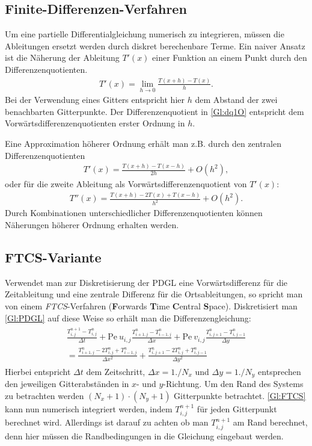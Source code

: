 \subsection{Finite-Differenzen-Verfahren}
Um eine partielle Differentialgleichung numerisch zu integrieren, müssen die Ableitungen ersetzt werden durch diskret berechenbare Terme.
Ein naiver Ansatz ist die Näherung der Ableitung $T'(x)$ einer Funktion an einem Punkt durch den Differenzenquotienten.
\begin{align}
  T'(x) = \lim_{h\rightarrow 0}\frac{T(x+h)-T(x)}{h}.\label{Gl:dq1O}
\end{align}
Bei der Verwendung eines Gitters entspricht hier $h$ dem Abstand der zwei benachbarten Gitterpunkte.
Der Differenzenquotient in \cref{Gl:dq1O} entspricht dem Vorwärtsdifferenzenquotienten erster Ordnung in $h$.

Eine Approximation höherer Ordnung erhält man z.B. durch den zentralen Differenzenquotienten
\begin{align}
  T'(x) = \frac{T(x+h)-T(x-h)}{2h} + O(h^2),\label{Gl:dq2O}
\end{align}
oder für die zweite Ableitung als Vorwärtsdifferenzenquotient von $T'(x)$:
\begin{align}
  T''(x) = \frac{T(x+h)-2T(x)+T(x-h)}{h^2}+O(h^2).\label{Gl:dq2O2Abl}
\end{align}
Durch Kombinationen unterschiedlicher Differenzenquotienten können Näherungen höherer Ordnung erhalten werden.
\subsection{FTCS-Variante}
Verwendet man zur Diskretisierung der PDGL eine Vorwärtsdifferenz für die Zeitableitung und eine zentrale Differenz für die Ortsableitungen, so spricht man von einem \emph{FTCS}-Verfahren (\textbf{F}orwards \textbf{T}ime \textbf{C}entral \textbf{S}pace).
Diskretisiert man \cref{Gl:PDGL} auf diese Weise so erhält man die Differenzengleichung:
\begin{align}
  \begin{split}
  \frac{T^{n+1}_{i,j}-T^{n}_{i,j}}{\Delta t} + \text{Pe}~ u_{i,j} \frac{T^{n}_{i+1,j}-T^{n}_{i-1,j}}{\Delta x} + \text{Pe}~ v_{i,j} \frac{T^{n}_{i,j+1}-T^{n}_{i,j-1}}{\Delta y}\\
   =  \frac{T^{n}_{i+1,j}-2T^{n}_{i,j}+T^{n}_{i-1,j}}{\Delta x^2} +\frac{T^{n}_{i,j+1}-2T^{n}_{i,j}+T^{n}_{i,j-1}}{\Delta y^2}
 \end{split}\label{Gl:FTCS}
\end{align}
Hierbei entspricht $\Delta t$ dem Zeitschritt, $\Delta x = 1./N_x$ und $\Delta y = 1./N_y$ entsprechen den jeweiligen Gitterabständen in $x$- und $y$-Richtung.
Um den Rand des Systems zu betrachten werden $(N_x+1) \cdot (N_y+1)$ Gitterpunkte betrachtet.
\cref{Gl:FTCS} kann nun numerisch integriert werden, indem $T^{n+1}_{i,j}$ für jeden Gitterpunkt berechnet wird.
Allerdings ist darauf zu achten ob man $T^{n+1}_{i,j}$ am Rand berechnet, denn hier müssen die Randbedingungen in die Gleichung eingebaut werden.

